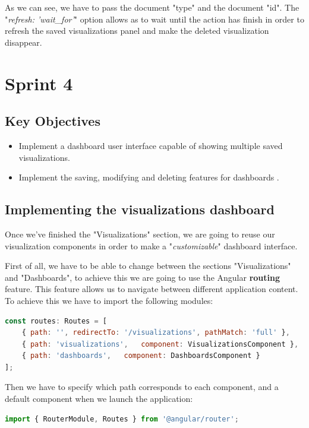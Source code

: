 \documentclass[a4paper, 12pt, english]{book}
\begin{document}
As we can see, we have to pass the document "type" and the document "id". The "\textit{refresh: 'wait\_for'}" option allows as to wait until the action has finish in order to refresh the saved visualizations panel and make the deleted visualization disappear.


\section{Sprint 4}
\label{sec:sprint-4}

\subsection{Key Objectives}
\label{sec:key-objectives}
\begin{itemize}
    \item Implement a dashboard user interface capable of showing multiple saved visualizations.
    \item Implement the saving, modifying and deleting features for dashboards .
\end{itemize}

\subsection{Implementing the visualizations dashboard}
\label{sec:visualizations-dashboard}
Once we've finished the "Visualizations" section, we are going to reuse our visualization components in order to make a "\textit{customizable}" dashboard interface.

First of all, we have to be able to change between the sections "Visualizations" and "Dashboards", to achieve this we are going to use the Angular \textbf{routing} feature. This feature allows us to navigate between different application content. To achieve this we have to import the following modules:
\begin{lstlisting}[language=javascript, caption=Paths definition, label=code:dashboard-object]
const routes: Routes = [
	{ path: '', redirectTo: '/visualizations', pathMatch: 'full' },
	{ path: 'visualizations',	component: VisualizationsComponent },
	{ path: 'dashboards',	component: DashboardsComponent }
];
\end{lstlisting}

Then we have to specify which path corresponds to each component, and a default component when we launch the application:
\begin{lstlisting}[language=javascript, caption=Routing modules, label=code:dashboard-object]
import { RouterModule, Routes } from '@angular/router';
\end{lstlisting}
\end{document}

